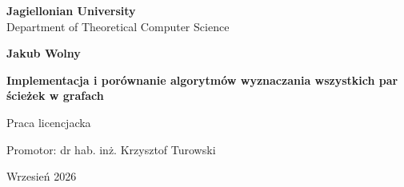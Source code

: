 \begin{titlepage}
	\begin{center}
        
		\large
		\textbf{Jagiellonian University}\\
		Department of Theoretical Computer Science\\

		\vspace{1.5cm}

		\Large
		\textbf{Jakub Wolny}

		\vspace*{2cm}

		\textbf{\LARGE Implementacja i porównanie algorytmów wyznaczania wszystkich par ścieżek w grafach}
		
		\vspace{0.5cm}
		\large
		
		\vfill
		\Large
		Praca licencjacka

		\vfill
		\Large
		Promotor: dr hab. in\.z. Krzysztof Turowski
		
		\vspace{0.8cm}
		
		Wrzesień 2026
		
\end{center}
\end{titlepage}